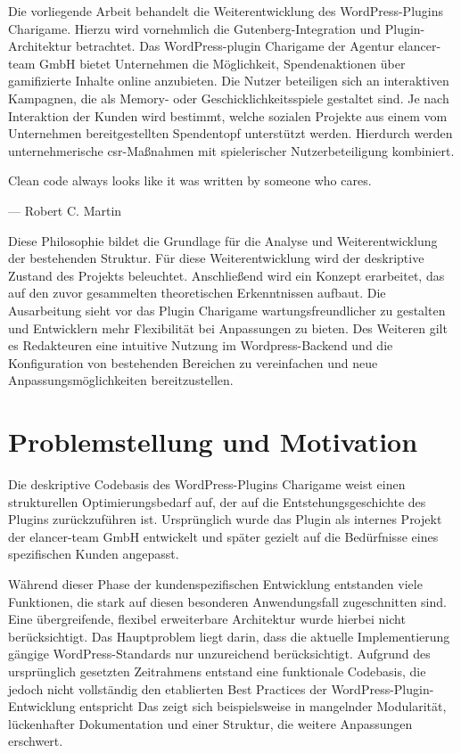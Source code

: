 Die vorliegende Arbeit behandelt die Weiterentwicklung des WordPress-Plugins Charigame.
Hierzu wird vornehmlich die Gutenberg-Integration und Plugin-Architektur betrachtet.
Das WordPress-\gls{plugin} Charigame der Agentur elancer-team GmbH bietet Unternehmen die Möglichkeit, Spendenaktionen über gamifizierte Inhalte online anzubieten.
Die Nutzer beteiligen sich an interaktiven Kampagnen, die als Memory- oder Geschicklichkeitsspiele gestaltet sind.
Je nach Interaktion der Kunden wird bestimmt, welche sozialen Projekte aus einem vom Unternehmen bereitgestellten Spendentopf unterstützt werden.
Hierdurch werden unternehmerische \gls{csr}-Maßnahmen mit spielerischer Nutzerbeteiligung kombiniert.

\epigraph{ \glqq Clean code always looks like it was written by someone who cares.\grqq{}}{--- \textup{Robert C. Martin}}

Diese Philosophie bildet die Grundlage für die Analyse und Weiterentwicklung der bestehenden Struktur.
Für diese Weiterentwicklung wird der deskriptive Zustand des Projekts beleuchtet.
Anschließend wird ein Konzept erarbeitet, das auf den zuvor gesammelten theoretischen Erkenntnissen aufbaut.
Die Ausarbeitung sieht vor das Plugin Charigame wartungsfreundlicher zu gestalten und Entwicklern mehr Flexibilität bei Anpassungen zu bieten.
Des Weiteren gilt es Redakteuren eine intuitive Nutzung im Wordpress-Backend und die Konfiguration von bestehenden Bereichen zu vereinfachen und neue Anpassungsmöglichkeiten bereitzustellen.

\section{Problemstellung und Motivation}

Die deskriptive Codebasis des WordPress-Plugins Charigame weist einen strukturellen Optimierungsbedarf auf, der auf die Entstehungsgeschichte des Plugins zurückzuführen ist.
Ursprünglich wurde das Plugin als internes Projekt der elancer-team GmbH entwickelt und später gezielt auf die Bedürfnisse eines spezifischen Kunden angepasst.

Während dieser Phase der kundenspezifischen Entwicklung entstanden viele Funktionen, die stark auf diesen besonderen Anwendungsfall zugeschnitten sind.
Eine übergreifende, flexibel erweiterbare Architektur wurde hierbei nicht berücksichtigt.
Das Hauptproblem liegt darin, dass die aktuelle Implementierung gängige WordPress-Standards nur unzureichend berücksichtigt.
Aufgrund des ursprünglich gesetzten Zeitrahmens entstand eine funktionale Codebasis, die jedoch nicht vollständig den etablierten Best Practices der WordPress-Plugin-Entwicklung entspricht
Das zeigt sich beispielsweise in mangelnder Modularität, lückenhafter Dokumentation und einer Struktur, die weitere Anpassungen erschwert.

